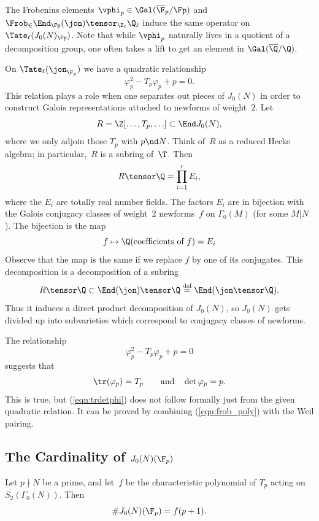 \documentclass{report}
\begin{document}
The Frobenius elements $\vphi_p{}\in\Gal(\overline{\F}_p/\Fp)$ and
$\Frob_\in\End_{\Fp}(\jon)\tensor_{\Z_{\ell}}\Q_{\ell}$ induce the
same operator on $\Tate_\ell(J_0(N)_{\Fp})$.  Note that while $\vphi_p$
naturally lives in a quotient of a decomposition group, one often
takes a lift to get an element in $\Gal(\overline{\Q}/\Q)$.

On $\Tate_{\ell}(\jon_{\F_p})$ we have a quadratic relationship
\[
  \varphi_p^2-T_p\varphi_p+p=0.
\]
This relation plays a role when one separates out pieces of $J_0(N)$
in order to construct Galois representations attached to newforms of
weight~$2$.  Let
\[
  R=\Z[\ldots,T_p,\ldots]\subset\End J_0(N),
\]
where we only adjoin those $T_p$ with $p\nd N$.
Think of~$R$ as a reduced Hecke algebra; in particular,~$R$
is a subring of~$\T$. Then
\[
  R\tensor\Q=\prod_{i=1}^{r}E_i,
\]
where the $E_i$ are totally real number fields.
The factors $E_i$ are in bijection with the Galois conjugacy classes
of weight~$2$ newforms~$f$ on $\Gamma_0(M)$ (for some $M|N$).
The bijection is the map
\[
  f\mapsto\Q(\text{coefficients of $f$})=E_i
\]
Observe that the map is the same if we replace $f$ by one of its conjugates.
This decomposition is a decomposition of a subring
\[
  R\tensor\Q\subset\End(\jon)\tensor\Q
  \stackrel{\text{def}}{=}\End(\jon\tensor\Q).
\]
Thus it induces a direct product decomposition of
$J_0(N)$, so $J_0(N)$ gets divided up into subvarieties
which correspond to conjugacy classes of newforms.

The relationship
\begin{equation}\label{eqn:frob_poly}
  \varphi_p^2-T_p\varphi_p+p=0
\end{equation}
suggests that
\begin{equation}\label{eqn:trdetphi}
  \tr(\varphi_p)=T_p\qquad\text{and}\quad\det\varphi_p=p.
\end{equation}
This is true, but (\ref{eqn:trdetphi}) does not follow formally
just from the given quadratic relation.  It can be proved by
combining (\ref{eqn:frob_poly}) with the Weil pairing.

\subsection{The Cardinality of $J_0(N)(\F_{p})$}
\begin{proposition}
Let $p\nmid N$ be a prime, and
let~$f$ be the characteristic polynomial of $T_p$ acting on
$S_2(\Gamma_0(N))$.  Then
\[
  \# J_0(N)(\F_p) = f(p+1).
\]
\end{proposition}
\end{document}
